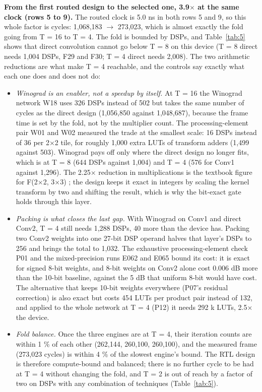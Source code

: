 \textbf{From the first routed design to the selected one, 3.9$\times$ at the same clock (rows 5 to 9).} The routed clock is 5.0 ns in both rows 5 and 9, so this whole factor is cycles: 1,068,183 $\rightarrow$ 273,023, which is almost exactly the fold going from T = 16 to T = 4. The fold is bounded by DSPs, and Table~\ref{tab:5} shows that direct convolution cannot go below T = 8 on this device (T = 8 direct needs 1,004 DSPs, F29 and F30; T = 4 direct needs 2,008). The two arithmetic reductions are what make T = 4 reachable, and the controls say exactly what each one does and does not do:

\begin{itemize}
\item \emph{Winograd is an enabler, not a speedup by itself.} At T = 16 the Winograd network W18 uses 326 DSPs instead of 502 but takes the same number of cycles as the direct design (1,056,850 against 1,048,687), because the frame time is set by the fold, not by the multiplier count. The processing-element pair W01 and W02 measured the trade at the smallest scale: 16 DSPs instead of 36 per 2$\times$2 tile, for roughly 1,000 extra LUTs of transform adders (1,499 against 503). Winograd pays off only where the direct design no longer fits, which is at T = 8 (644 DSPs against 1,004) and T = 4 (576 for Conv1 against 1,296). The 2.25$\times$ reduction in multiplications is the textbook figure for F(2$\times$2, 3$\times$3) \cite{ref16}; the design keeps it exact in integers by scaling the kernel transform by two and shifting the result, which is why the bit-exact gate holds through this layer.
\item \emph{Packing is what closes the last gap.} With Winograd on Conv1 and direct Conv2, T = 4 still needs 1,288 DSPs, 40 more than the device has. Packing two Conv2 weights into one 27-bit DSP operand halves that layer's DSPs to 256 and brings the total to 1,032. The exhaustive processing-element check P01 and the mixed-precision runs E062 and E065 bound its cost: it is exact for signed 8-bit weights, and 8-bit weights on Conv2 alone cost 0.006 dB more than the 10-bit baseline, against the 5 dB that uniform 8-bit would have cost. The alternative that keeps 10-bit weights everywhere (P07's residual correction) is also exact but costs 454 LUTs per product pair instead of 132, and applied to the whole network at T = 4 (P12) it needs 292 k LUTs, 2.5$\times$ the device.
\item \emph{Fold balance.} Once the three engines are at T = 4, their iteration counts are within 1 \% of each other (262,144, 260,100, 260,100), and the measured frame (273,023 cycles) is within 4 \% of the slowest engine's bound. The RTL design is therefore compute-bound and balanced; there is no further cycle to be had at T = 4 without changing the fold, and T = 2 is out of reach by a factor of two on DSPs with any combination of techniques (Table~\ref{tab:5}).

\end{itemize}
